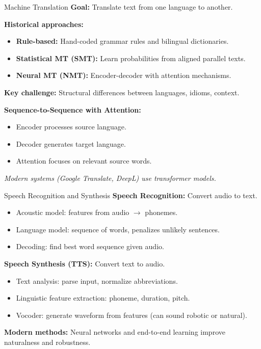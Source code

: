 \documentclass[10pt]{beamer}
\begin{document}
\begin{frame}{Machine Translation}
    \textbf{Goal:} Translate text from one language to another.

    \vspace{0.2cm}
    \textbf{Historical approaches:}
    \begin{itemize}
        \item \textbf{Rule-based:} Hand-coded grammar rules and bilingual dictionaries.
        \item \textbf{Statistical MT (SMT):} Learn probabilities from aligned parallel texts.
        \item \textbf{Neural MT (NMT):} Encoder-decoder with attention mechanisms.
    \end{itemize}

    \vspace{0.2cm}
    \textbf{Key challenge:} Structural differences between languages, idioms, context.

    \vspace{0.2cm}
    \textbf{Sequence-to-Sequence with Attention:}
    \begin{itemize}
        \item Encoder processes source language.
        \item Decoder generates target language.
        \item Attention focuses on relevant source words.
    \end{itemize}

    \vspace{0.2cm}
    \textit{Modern systems (Google Translate, DeepL) use transformer models.}
\end{frame}

\begin{frame}{Speech Recognition and Synthesis}
    \textbf{Speech Recognition:} Convert audio to text.
    \begin{itemize}
        \item Acoustic model: features from audio $\to$ phonemes.
        \item Language model: sequence of words, penalizes unlikely sentences.
        \item Decoding: find best word sequence given audio.
    \end{itemize}

    \vspace{0.2cm}
    \textbf{Speech Synthesis (TTS):} Convert text to audio.
    \begin{itemize}
        \item Text analysis: parse input, normalize abbreviations.
        \item Linguistic feature extraction: phoneme, duration, pitch.
        \item Vocoder: generate waveform from features (can sound robotic or natural).
    \end{itemize}

    \vspace{0.2cm}
    \textbf{Modern methods:} Neural networks and end-to-end learning improve naturalness and robustness.
\end{frame}
\end{document}
